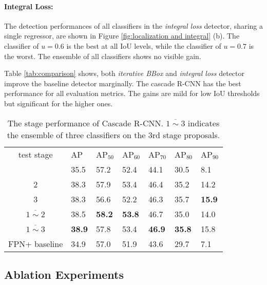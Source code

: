 \documentclass[10pt,twocolumn,letterpaper]{article}
\newcommand{\bd}[1]{\textbf{#1}}
\newcommand{\tablestyle}[2]{\setlength{\tabcolsep}{#1}\renewcommand{\arraystretch}{#2}\centering\footnotesize}
\begin{document}
\paragraph{Integral Loss:} The detection performances of all classifiers
in the \textit{integral loss} detector, sharing a single regressor, are shown in
Figure \ref{fig:localization and integral} (b). The classifier of $u=0.6$
is the best at all IoU levels, while the classifier of $u=0.7$ is the worst.
The ensemble of all classifiers shows no visible gain.

Table \ref{tab:comparison} shows, both \textit{iterative BBox} and \textit{integral loss} detector improve the baseline detector marginally. The cascade R-CNN has the best performance for all evaluation metrics. The gains are mild for low IoU thresholds but significant for the higher ones.

\begin{table}[t]
\tablestyle{1.8pt}{1.2}
\begin{tabular}{c|x{22}|x{22}x{22}x{22}x{22}x{22}}
test stage & AP & AP$_{50}$ & AP$_{60}$ &AP$_{70}$ &AP$_{80}$ &AP$_{90}$\\ [.1em] &35.5 &57.2  &52.4 &44.1 &30.5  &8.1\\
2 &38.3 &57.9  &53.4 &46.4 &35.2  &14.2\\
3 &38.3 &56.6  &52.2 &46.3 &35.7  &\bd{15.9}\\
$\overline{1\sim{2}}$ &38.5 &\bd{58.2}  &\bd{53.8} &46.7 &35.0  &14.0\\
$\overline{1\sim{3}}$ &\bd{38.9} &57.8  &53.4 &\bd{46.9} &\bd{35.8}  &15.8\\\hline
FPN+ baseline &34.9 &57.0  &51.9 &43.6 &29.7  &7.1\\
\end{tabular}\vspace{2mm}
\caption{The stage performance of Cascade R-CNN. $\overline{1\sim{3}}$ indicates the ensemble of three classifiers on the 3rd stage proposals.}
\label{tab:stage performance}
\end{table}


\subsection{Ablation Experiments}
\end{document}
